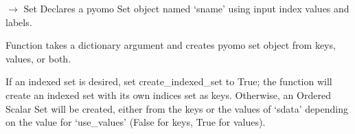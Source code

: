 \documentclass[letterpaper,10pt,english]{sphinxmanual}
\begin{document}
\begin{fulllineitems}
\begin{fulllineitems}
\label{\detokenize{src.common.model:src.common.model.Model._active}}
\pysigstartsignatures
\pysigline
{}
\pysigstopsignatures
\end{fulllineitems}


\begin{fulllineitems}
\label{\detokenize{src.common.model:src.common.model.Model._declare_set_with_dict}}
\pysigstartsignatures
\pysiglinewithargsret
{}
{\sphinxparamcomma {}\sphinxparamcomma {}\sphinxparamcomma {}\sphinxparamcomma {}\sphinxparamcomma {}\sphinxparamcomma {}}
{{ $\rightarrow$ Set}}
\pysigstopsignatures
\sphinxAtStartPar
Declares a pyomo Set object named ‘sname’ using input index values and labels.

\sphinxAtStartPar
Function takes a dictionary argument and creates pyomo set object from keys, values, or both.

\sphinxAtStartPar
If an indexed set is desired, set create\_indexed\_set to True; the function will create an
indexed set with its own indices set as keys. Otherwise, an Ordered Scalar Set will be
created, either from the keys or the values of ‘sdata’ depending on the value for
‘use\_values’ (False for keys, True for values).


\end{fulllineitems}
\end{fulllineitems}
\end{document}
